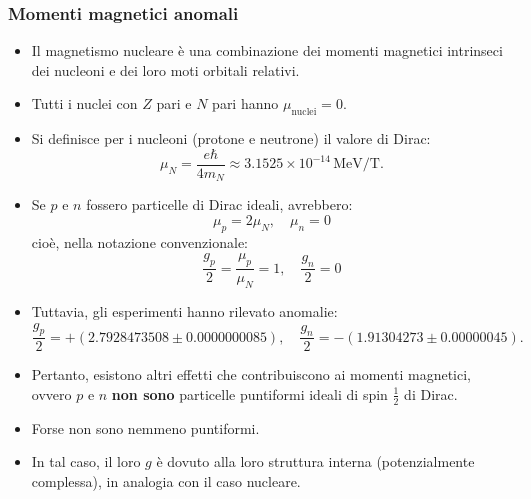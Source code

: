 \subsubsection{Momenti magnetici anomali}
\begin{itemize}
    \item Il magnetismo nucleare è una combinazione dei momenti magnetici intrinseci dei nucleoni e dei loro moti orbitali relativi.
    \item Tutti i nuclei con $Z$ pari e $N$ pari hanno $\mu_{\text{nuclei}} = 0$.
    \item Si definisce per i nucleoni (protone e neutrone) il valore di Dirac:
    \[
    \mu_N = \frac{e\hbar}{4m_N} \approx 3.1525 \times 10^{-14} \, \text{MeV/T}.
    \]
    \item Se $p$ e $n$ fossero particelle di Dirac ideali, avrebbero:
    \[
    \mu_p = 2\mu_N, \quad \mu_n = 0
    \]
    cioè, nella notazione convenzionale:
    \[
    \frac{g_p}{2} = \frac{\mu_p}{\mu_N} = 1, \quad \frac{g_n}{2} = 0
    \]
    \item Tuttavia, gli esperimenti hanno rilevato anomalie:
    \[
    \frac{g_p}{2} = +(2.7928473508 \pm 0.0000000085), \quad 
    \frac{g_n}{2} = -(1.91304273 \pm 0.00000045).
    \]
    \item Pertanto, esistono altri effetti che contribuiscono ai momenti magnetici, ovvero $p$ e $n$ \textbf{non sono} particelle puntiformi ideali di spin $\frac{1}{2}$ di Dirac. 
    \item Forse non sono nemmeno puntiformi.
    \item In tal caso, il loro $g$ è dovuto alla loro struttura interna (potenzialmente complessa), in analogia con il caso nucleare.
\end{itemize}
